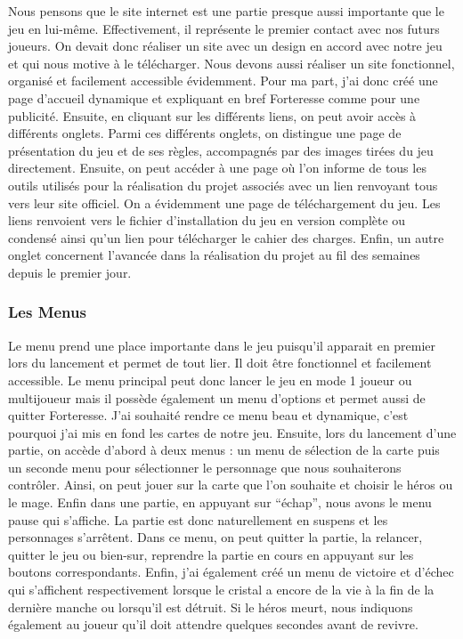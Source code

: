 \documentclass[a4paper, 12pt]{article}
\begin{document}
Nous pensons que le site internet est une partie presque aussi importante que le jeu en lui-même. Effectivement, il représente le premier contact avec nos futurs joueurs. On devait donc réaliser un site avec un design en accord avec notre jeu et qui nous motive à le télécharger. Nous devons aussi réaliser un site fonctionnel, organisé et facilement accessible évidemment. Pour ma part, j’ai donc créé une page d’accueil dynamique et expliquant en bref Forteresse comme pour une publicité. Ensuite, en cliquant sur les différents liens, on peut avoir accès à différents onglets. Parmi ces différents onglets, on distingue une page de présentation du jeu et de ses règles, accompagnés par des images tirées du jeu directement. Ensuite, on peut accéder à une page où l’on informe de tous les outils utilisés pour la réalisation du projet associés avec un lien renvoyant tous vers leur site officiel. On a évidemment une page de téléchargement du jeu. Les liens renvoient vers le fichier d’installation du jeu en version complète ou condensé ainsi qu’un lien pour télécharger le cahier des charges. Enfin, un autre onglet concernent l’avancée dans la réalisation du projet au fil des semaines depuis le premier jour.

		\subsubsection{Les Menus}

Le menu prend une place importante dans le jeu puisqu’il apparait en premier lors du lancement et permet de tout lier. Il doit être fonctionnel et facilement accessible. Le menu principal peut donc lancer le jeu en mode 1 joueur ou multijoueur mais il possède également un menu d’options et permet aussi de quitter Forteresse. J’ai souhaité rendre ce menu beau et dynamique, c’est pourquoi j’ai mis en fond les cartes de notre jeu. Ensuite, lors du lancement d’une partie, on accède d’abord à deux menus : un menu de sélection de la carte puis un seconde menu pour sélectionner le personnage que nous souhaiterons contrôler. Ainsi, on peut jouer sur la carte que l’on souhaite et choisir le héros ou le mage. Enfin dans une partie, en appuyant sur “échap”, nous avons le menu pause qui s’affiche. La partie est donc naturellement en suspens et les personnages s’arrêtent. Dans ce menu, on peut quitter la partie, la relancer, quitter le jeu ou bien-sur, reprendre la partie en cours en appuyant sur les boutons correspondants. Enfin, j’ai également créé un menu de victoire et d’échec qui s’affichent respectivement lorsque le cristal a encore de la vie à la fin de la dernière manche ou lorsqu’il est détruit. Si le héros meurt, nous indiquons également au joueur qu’il doit attendre quelques secondes avant de revivre.
\end{document}
